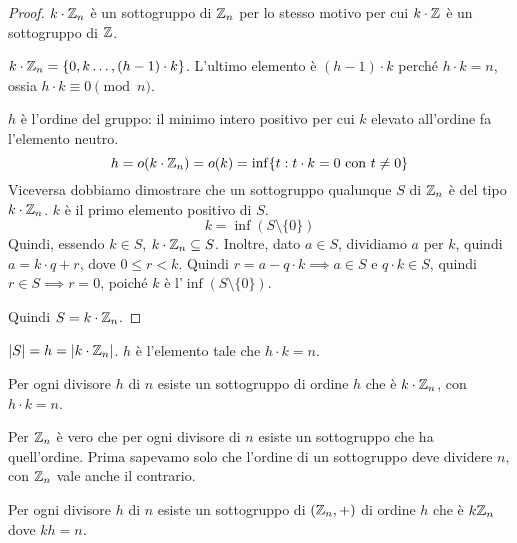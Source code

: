 \begin{proof}
$k \cdot \mathbb{Z}_n$ \`e un sottogruppo di $\mathbb{Z}_n$ per lo stesso motivo per cui $k \cdot \mathbb{Z}$ \`e un sottogruppo di $\mathbb{Z}$.

$k \cdot \mathbb{Z}_n = \{ 0, k \ldots , (h - 1) \cdot k \}$. L'ultimo elemento \`e $(h - 1) \cdot k$ perch\'e $h \cdot k = n$, ossia $h \cdot k \equiv 0 \pmod{n}$.

$h$ \`e l'ordine del gruppo: il minimo intero positivo per cui $k$ elevato all'ordine fa l'elemento neutro.
\[
h = o (k \cdot \mathbb{Z}_n) = o(k) = \inf \{t : t \cdot k = 0 \text{ con } t \neq 0\}
\]
Viceversa dobbiamo dimostrare che un sottogruppo qualunque $S$ di $\mathbb{Z}_n$ \`e del tipo $k \cdot \mathbb{Z}_n$. $k$ \`e il primo elemento positivo di $S$.
\[
k = \inf( S \setminus \{0\})
\]
Quindi, essendo $k \in S$, $k \cdot \mathbb{Z}_n \subseteq S$. Inoltre, dato $a \in S$, dividiamo $a$ per $k$, quindi $a = k \cdot q + r$, dove $0 \le r < k$. Quindi $r = a - q \cdot k \implies a \in S$ e $q \cdot k \in S$, quindi $r \in S \implies r = 0$, poich\'e $k$ \`e l'$\inf(S \setminus \{0\})$.

Quindi $S = k \cdot \mathbb{Z}_n$.
\end{proof}
$\left\lvert{S}\right\rvert = h = \left\lvert{k \cdot \mathbb{Z}_n}\right\rvert$. $h$ \`e l'elemento tale che $h \cdot k = n$.

Per ogni divisore $h$ di $n$ esiste un sottogruppo di ordine $h$ che \`e $k \cdot \mathbb{Z}_n$, con $h \cdot k = n$.

Per $\mathbb{Z}_n$ \`e vero che per ogni divisore di $n$ esiste un sottogruppo che ha quell'ordine. Prima sapevamo solo che l'ordine di un sottogruppo deve dividere $n$, con $\mathbb{Z}_n$ vale anche il contrario.

Per ogni divisore $h$ di $n$ esiste un sottogruppo di $(\mathbb{Z}_n, +)$ di ordine $h$ che \`e $k \mathbb{Z}_n$ dove $k h = n$.

